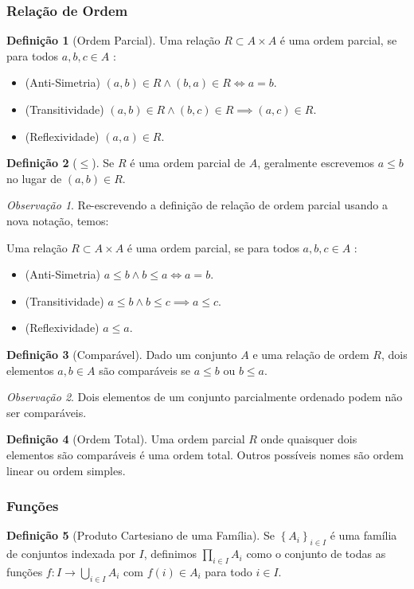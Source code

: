 \documentclass{article}
\theoremstyle{plain}
\theoremstyle{definition}
\newtheorem{definicao}{Definição}[section]
\theoremstyle{remark}
\newtheorem{obs}{Observação}[section]
\begin{document}
\subsubsection{Relação de Ordem}
\begin{definicao}[Ordem Parcial]
	Uma relação $R \subset A \times A$ é  uma ordem parcial, se para todos $a,b,c \in A$ :
	\begin{itemize}
		\item (Anti-Simetria) $(a,b) \in R \land (b,a) \in R \iff  a = b$.
		\item (Transitividade)  $(a,b)\in R \land (b,c)\in R \implies (a,c) \in R$.
		\item  (Reflexividade) $(a,a) \in R$.
	\end{itemize}
\end{definicao}
\begin{definicao}[$\leq$]
	Se $R$ é uma ordem parcial de $A$, geralmente escrevemos $a\leq b$ no lugar de  $(a,b) \in R$.
\end{definicao}
\begin{obs}

	Re-escrevendo a definição de relação de ordem parcial usando a nova notação, temos:

	Uma relação $R \subset A \times A$ é uma ordem parcial, se para todos $a,b,c \in A$ :
	\begin{itemize}
		\item (Anti-Simetria) $a \leq b \land b \leq a \iff a = b$.
		\item (Transitividade)  $a \leq b \land b \leq c \implies a \leq c$.
		\item  (Reflexividade) $a \leq a$.
	\end{itemize}
\end{obs}
\begin{definicao}[Comparável]
	Dado um conjunto $A$ e uma relação de ordem $R$, dois elementos $a,b\in A$ são comparáveis se $a\leq b$ ou $b\leq a$.
\end{definicao}
\begin{obs}
	Dois elementos de um conjunto parcialmente ordenado podem não ser comparáveis.
\end{obs}
\begin{definicao}[Ordem Total]
	Uma ordem parcial $R$ onde quaisquer dois elementos são comparáveis é uma ordem total. Outros possíveis nomes são ordem linear ou ordem simples.
\end{definicao}
\subsubsection{Funções}
\begin{definicao}[Produto Cartesiano de uma Família]
	Se $\left\{ A_i \right\}_{i\in I}$ é uma família de conjuntos indexada por $I$, definimos $\displaystyle\prod_{i\in I} A_i$  como o conjunto de todas as funções $f:I \to \displaystyle\bigcup_{i\in I} A_i $  com $f(i) \in A_i$ para todo $i\in I$.
\end{definicao}
\end{document}
